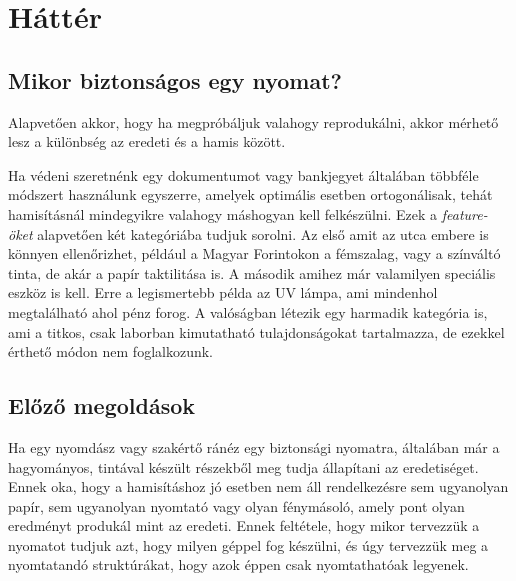 %

\newpage
\section{Háttér}

%
%




\subsection{Mikor biztonságos egy nyomat?}

Alapvetően akkor, hogy ha megpróbáljuk valahogy reprodukálni, akkor
mérhető lesz a különbség az eredeti és a hamis között.

Ha védeni szeretnénk egy dokumentumot vagy bankjegyet általában 
többféle módszert használunk egyszerre, amelyek optimális esetben 
ortogonálisak, tehát hamisításnál mindegyikre valahogy máshogyan kell 
felkészülni. Ezek a \textit{feature-öket} alapvetően két kategóriába tudjuk sorolni. 
Az első amit az utca embere is könnyen ellenőrizhet, például a Magyar Forintokon 
a fémszalag, vagy a színváltó tinta, de akár a papír taktilitása is.
A második amihez már valamilyen speciális eszköz is kell. Erre a legismertebb 
példa az UV lámpa, ami mindenhol megtalálható ahol pénz forog.
A valóságban létezik egy harmadik kategória is, ami a titkos, csak 
laborban kimutatható tulajdonságokat tartalmazza, de ezekkel érthető
módon nem foglalkozunk.


\subsection{Előző megoldások}

Ha egy nyomdász vagy szakértő ránéz egy biztonsági nyomatra, 
általában már a hagyományos, tintával készült részekből meg tudja
állapítani az eredetiséget. Ennek oka, hogy a hamisításhoz jó esetben nem áll 
rendelkezésre sem ugyanolyan papír, sem ugyanolyan nyomtató vagy olyan fénymásoló,
amely pont olyan eredményt produkál mint az eredeti.
Ennek feltétele, hogy mikor tervezzük a nyomatot tudjuk azt, hogy
milyen géppel fog készülni, és úgy tervezzük meg a nyomtatandó struktúrákat,
hogy azok éppen csak nyomtathatóak legyenek.


